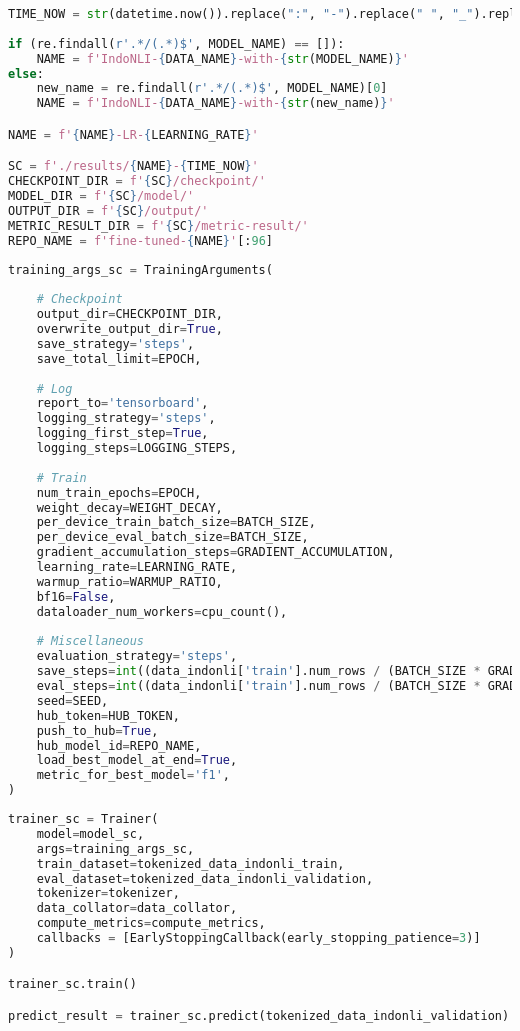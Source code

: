 \begin{lstlisting}[language=Python, caption=Perancangan penamaan eksperimen \emph{sequence classification task}]
TIME_NOW = str(datetime.now()).replace(":", "-").replace(" ", "_").replace(".", "_")
    
if (re.findall(r'.*/(.*)$', MODEL_NAME) == []): 
    NAME = f'IndoNLI-{DATA_NAME}-with-{str(MODEL_NAME)}'
else:
    new_name = re.findall(r'.*/(.*)$', MODEL_NAME)[0]
    NAME = f'IndoNLI-{DATA_NAME}-with-{str(new_name)}'

NAME = f'{NAME}-LR-{LEARNING_RATE}'

SC = f'./results/{NAME}-{TIME_NOW}'
CHECKPOINT_DIR = f'{SC}/checkpoint/'
MODEL_DIR = f'{SC}/model/'
OUTPUT_DIR = f'{SC}/output/'
METRIC_RESULT_DIR = f'{SC}/metric-result/'
REPO_NAME = f'fine-tuned-{NAME}'[:96]
\end{lstlisting}

\begin{lstlisting}[language=Python, caption=Perancangan argumen latih (\emph{training arguments}) \emph{sequence classification}]
training_args_sc = TrainingArguments(
        
    # Checkpoint
    output_dir=CHECKPOINT_DIR,
    overwrite_output_dir=True,
    save_strategy='steps',
    save_total_limit=EPOCH,
    
    # Log
    report_to='tensorboard',
    logging_strategy='steps',
    logging_first_step=True,
    logging_steps=LOGGING_STEPS,
    
    # Train
    num_train_epochs=EPOCH,
    weight_decay=WEIGHT_DECAY,
    per_device_train_batch_size=BATCH_SIZE,
    per_device_eval_batch_size=BATCH_SIZE,
    gradient_accumulation_steps=GRADIENT_ACCUMULATION,
    learning_rate=LEARNING_RATE,
    warmup_ratio=WARMUP_RATIO,
    bf16=False,
    dataloader_num_workers=cpu_count(),
    
    # Miscellaneous
    evaluation_strategy='steps',
    save_steps=int((data_indonli['train'].num_rows / (BATCH_SIZE * GRADIENT_ACCUMULATION)) * EVAL_STEPS_RATIO),
    eval_steps=int((data_indonli['train'].num_rows / (BATCH_SIZE * GRADIENT_ACCUMULATION)) * EVAL_STEPS_RATIO),
    seed=SEED,
    hub_token=HUB_TOKEN,
    push_to_hub=True,
    hub_model_id=REPO_NAME,
    load_best_model_at_end=True,
    metric_for_best_model='f1',
)
\end{lstlisting}

\begin{lstlisting}[language=Python, caption=Melakukan \emph{training} dan prediksi jawaban \emph{sequence classification}]
trainer_sc = Trainer(
    model=model_sc,
    args=training_args_sc,
    train_dataset=tokenized_data_indonli_train,
    eval_dataset=tokenized_data_indonli_validation,
    tokenizer=tokenizer,
    data_collator=data_collator,
    compute_metrics=compute_metrics,
    callbacks = [EarlyStoppingCallback(early_stopping_patience=3)]
)

trainer_sc.train()

predict_result = trainer_sc.predict(tokenized_data_indonli_validation)
\end{lstlisting}

